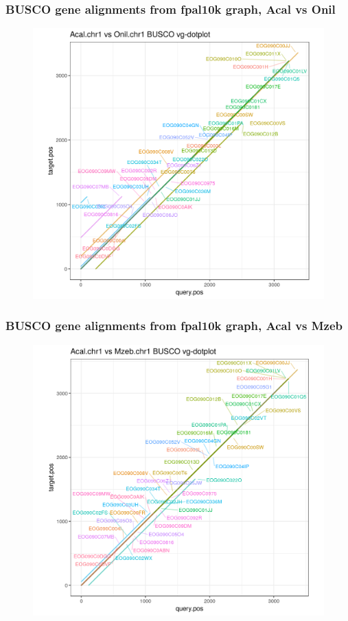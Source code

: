 \documentclass[aspectratio=169]{beamer}
\begin{document}
\begin{frame}
  \frametitle{BUSCO gene alignments from fpal10k graph, Acal vs Onil}
  \begin{figure}
    \includegraphics[scale=0.42,center]{cichlid_chr1_fpal10k_busco_dotplot_Acal_Onil.png}
  \end{figure}
\end{frame}

\begin{frame}
  \frametitle{BUSCO gene alignments from fpal10k graph, Acal vs Mzeb}
  \begin{figure}
    \includegraphics[scale=0.42,center]{cichlid_chr1_fpal10k_busco_dotplot_Acal_Mzeb.png}
  \end{figure}
\end{frame}
\end{document}

